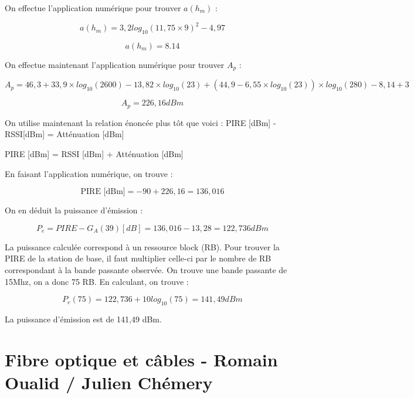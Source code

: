 \documentclass[12]{article}
\begin{document}
On effectue l'application numérique pour trouver $a(h_{m})$ :

\begin{equation*}
    a(h_{m}) = 3,2 log_{10}(11,75 \times 9)^2 - 4,97
\end{equation*}

\begin{equation*}
    a(h_{m}) = 8.14
\end{equation*}

On effectue maintenant l'application numérique pour trouver $A_{p}$ :

\begin{equation*}
    A_{p} = 46,3 + 33,9 \times log_{10}(2600) - 13,82 \times log_{10}(23) + (44,9 - 6,55 \times log_{10}(23) )\times log_{10}(280) - 8,14 + 3
\end{equation*}

\begin{equation*}
    A_{p} = 226,16 dBm
\end{equation*}

On utilise maintenant la relation énoncée plus tôt que voici : PIRE [dBm] - RSSI[dBm] = Atténuation [dBm]

PIRE [dBm] = RSSI [dBm] + Atténuation [dBm]

En faisant l'application numérique, on trouve : 

\begin{equation*}
    \text{PIRE [dBm]} = -90 + 226,16 = 136,016
\end{equation*}

On en déduit la puissance d'émission :

\begin{equation*}
    P_{e} = PIRE - G_{A}(39)[dB] = 136,016 - 13,28 = 122,736 dBm
\end{equation*}

La puissance calculée correspond à un ressource block (RB). Pour trouver la PIRE de la station de base, il faut multiplier celle-ci par le nombre de RB correspondant à la bande passante observée. On trouve une bande passante de 15Mhz, on a donc 75 RB. En calculant, on trouve :

\begin{equation*}
    P_{e}(75) = 122,736 + 10 log_{10}(75) = 141,49 dBm 
\end{equation*}

La puissance d'émission est de 141,49 dBm.

\section{Fibre optique et câbles - Romain Oualid / Julien Chémery}
\end{document}
